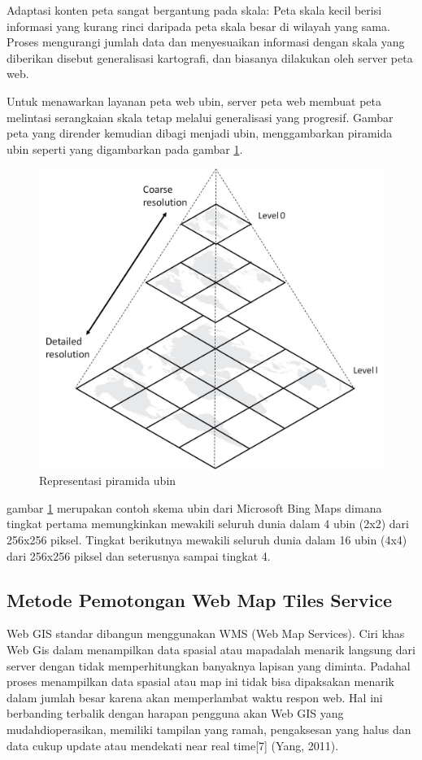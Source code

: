 Adaptasi konten peta sangat bergantung pada skala: Peta skala kecil berisi informasi yang kurang rinci daripada peta skala besar 
di wilayah yang sama. Proses mengurangi jumlah data dan menyesuaikan informasi dengan skala yang diberikan disebut generalisasi 
kartografi, dan biasanya dilakukan oleh server peta web.

Untuk menawarkan layanan peta web ubin, server peta web membuat peta melintasi serangkaian skala tetap melalui generalisasi yang 
progresif. Gambar peta yang dirender kemudian dibagi menjadi ubin, menggambarkan piramida ubin seperti yang digambarkan pada
gambar \ref{TilePyramid}.

\begin{figure}[ht]

\centerline{\includegraphics[width=1\textwidth]{figures/TilePyramid.jpg}}

\caption{Representasi piramida ubin}

\label{TilePyramid}

\end{figure}

gambar \ref{TilePyramid} merupakan contoh skema ubin dari Microsoft Bing Maps dimana tingkat pertama memungkinkan mewakili 
seluruh dunia dalam 4 ubin (2x2) dari  256x256 piksel. Tingkat berikutnya mewakili seluruh dunia dalam 16 ubin (4x4) dari 256x256 
piksel dan seterusnya sampai tingkat 4. 

\subsection{Metode Pemotongan Web Map Tiles Service}
Web GIS standar dibangun menggunakan WMS (Web Map Services). Ciri khas Web Gis dalam menampilkan data spasial atau mapadalah menarik 
langsung dari server dengan tidak memperhitungkan banyaknya lapisan yang diminta. Padahal proses menampilkan data spasial atau map ini 
tidak bisa dipaksakan menarik dalam jumlah besar karena akan memperlambat waktu respon web. Hal ini berbanding terbalik dengan harapan 
pengguna akan Web GIS yang mudahdioperasikan, memiliki tampilan yang ramah, pengaksesan yang halus dan data cukup update atau mendekati 
near real time[7] (Yang, 2011). 

